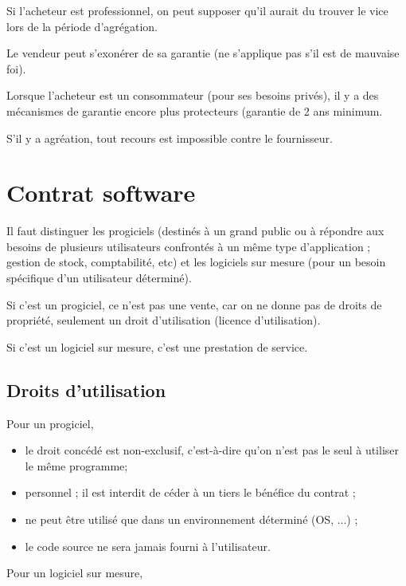 	Si l'acheteur est professionnel, on peut supposer qu'il aurait du trouver le vice lors de la période d'agrégation.
	
	Le vendeur peut s'exonérer de sa garantie (ne s'applique pas s'il est de mauvaise foi).
	
	Lorsque l'acheteur est un consommateur (pour ses besoins privés), il y a des mécanismes de garantie encore plus protecteurs (garantie de 2 ans minimum.
	
	S'il y a agréation, tout recours est impossible contre le fournisseur.
	
	
	
	\section{Contrat software}
	
	Il faut distinguer les progiciels (destinés à un grand public ou à répondre aux besoins de plusieurs utilisateurs confrontés à un même type d'application ; gestion de stock, comptabilité, etc) et les logiciels sur mesure (pour un besoin spécifique d'un utilisateur déterminé).
	
	Si c'est un progiciel, ce n'est pas une vente, car on ne donne pas de droits de propriété, seulement un droit d'utilisation (licence d'utilisation).
	
	Si c'est un logiciel sur mesure, c'est une prestation de service.
	
		\subsection{Droits d'utilisation}
		
		Pour un progiciel,
		\begin{itemize}
			\item le droit concédé est non-exclusif, c'est-à-dire qu'on n'est pas le seul à utiliser le même programme;
			\item personnel ; il est interdit de céder à un tiers le bénéfice du contrat ;
			\item ne peut être utilisé que dans un environnement déterminé (OS, ...) ;
			\item le code source ne sera jamais fourni à l'utilisateur.
		\end{itemize}
		
		Pour un logiciel sur mesure, 
		
